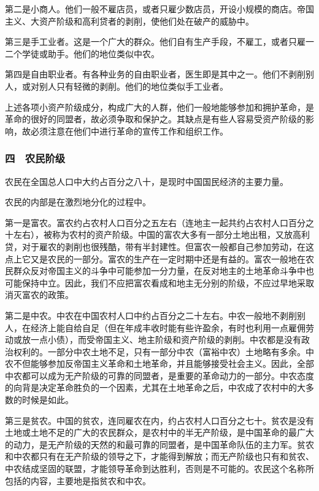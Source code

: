 第二是小商人。他们一般不雇店员，或者只雇少数店员，开设小规模的商店。帝国主义、大资产阶级和高利贷者的剥削，使他们处在破产的威胁中。

第三是手工业者。这是一个广大的群众。他们自有生产手段，不雇工，或者只雇一二个学徒或助手。他们的地位类似中农。

第四是自由职业者。有各种业务的自由职业者，医生即是其中之一。他们不剥削别人，或对别人只有轻微的剥削。他们的地位类似手工业者。

上述各项小资产阶级成分，构成广大的人群，他们一般地能够参加和拥护革命，是革命的很好的同盟者，故必须争取和保护之。其缺点是有些人容易受资产阶级的影响，故必须注意在他们中进行革命的宣传工作和组织工作。

\subsubsection{四　农民阶级}

农民在全国总人口中大约占百分之八十，是现时中国国民经济的主要力量。

农民的内部是在激烈地分化的过程中。

第一是富农。富农约占农村人口百分之五左右（连地主一起共约占农村人口百分之十左右），被称为农村的资产阶级。中国的富农大多有一部分土地出租，又放高利贷，对于雇农的剥削也很残酷，带有半封建性。但富农一般都自己参加劳动，在这点上它又是农民的一部分。富农的生产在一定时期中还是有益的。富农一般地在农民群众反对帝国主义的斗争中可能参加一分力量，在反对地主的土地革命斗争中也可能保持中立。因此，我们不应把富农看成和地主无分别的阶级，不应过早地采取消灭富农的政策。

第二是中农。中农在中国农村人口中约占百分之二十左右。中农一般地不剥削别人，在经济上能自给自足（但在年成丰收时能有些许盈余，有时也利用一点雇佣劳动或放一点小债），而受帝国主义、地主阶级和资产阶级的剥削。中农都是没有政治权利的。一部分中农土地不足，只有一部分中农（富裕中农）土地略有多余。中农不但能够参加反帝国主义革命和土地革命，并且能够接受社会主义。因此，全部中农都可以成为无产阶级的可靠的同盟者，是重要的革命动力的一部分。中农态度的向背是决定革命胜负的一个因素，尤其在土地革命之后，中农成了农村中的大多数的时候是如此。

第三是贫农。中国的贫农，连同雇农在内，约占农村人口百分之七十。贫农是没有土地或土地不足的广大的农民群众，是农村中的半无产阶级，是中国革命的最广大的动力，是无产阶级的天然的和最可靠的同盟者，是中国革命队伍的主力军。贫农和中农都只有在无产阶级的领导之下，才能得到解放；而无产阶级也只有和贫农、中农结成坚固的联盟，才能领导革命到达胜利，否则是不可能的。农民这个名称所包括的内容，主要地是指贫农和中农。


